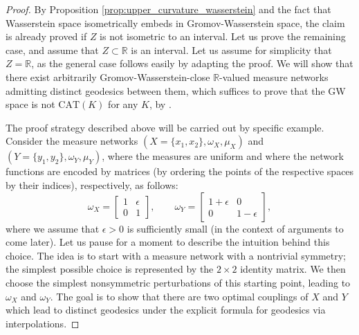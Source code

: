 \documentclass{article}
\theoremstyle{definition}
\newcommand{\R}{\mathbb{R}}
\begin{document}
\begin{proof}
    By Proposition \ref{prop:upper_curvature_wasserstein} and the fact that Wasserstein space isometrically embeds in Gromov-Wasserstein space, the claim is already proved if $Z$ is not isometric to an interval. Let us prove the remaining case, and assume that $Z \subset \R$ is an interval. Let us assume for simplicity that $Z=\R$, as the general case follows easily by adapting the proof. We will show that there exist arbitrarily Gromov-Wasserstein-close $\R$-valued measure networks admitting distinct geodesics between them, which suffices to prove that the GW space is not $\mathrm{CAT}(K)$ for any $K$, by \cite[Proposition II.1.4]{bridsonhaefliger1999}. 

    The proof strategy described above will be carried out by specific example. Consider the measure networks $(X = \{x_1,x_2\}, \omega_X, \mu_X)$ and $(Y = \{y_1,y_2\}, \omega_Y, \mu_Y)$, where the measures are uniform and where the network functions are encoded by matrices (by ordering the points of the respective spaces by their indices), respectively, as follows:
    \[
    \omega_X = \begin{bmatrix}
        1 & \epsilon \\
        0 & 1
    \end{bmatrix}, \qquad \omega_Y = \begin{bmatrix}
        1+ \epsilon & 0 \\
        0 & 1-\epsilon
    \end{bmatrix},
    \]
    where we assume that $\epsilon > 0$ is sufficiently small (in the context of arguments to come later). Let us pause for a moment to describe the intuition behind this choice. The idea is to start with a measure network with a nontrivial symmetry; the simplest possible choice is represented by the $2 \times 2$ identity matrix. We then choose the simplest nonsymmetric perturbations of this starting point, leading to $\omega_X$ and $\omega_Y$. The goal is to show that there are two optimal couplings of $X$ and $Y$ which lead to distinct geodesics under the explicit formula for geodesics via interpolations. 


\end{proof}
\end{document}
